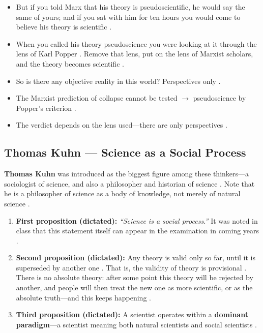 \begin{CriticalPoint}
\begin{itemize}
    \item But if you told Marx that his theory is pseudoscientific, he would say the same of yours; and if you sat with him for ten hours you would come to believe his theory is scientific .
    \item When you called his theory pseudoscience you were looking at it through the lens of Karl Popper . Remove that lens, put on the lens of Marxist scholars, and the theory becomes scientific .
    \item So is there any objective reality in this world? Perspectives only .
\end{itemize}
\end{CriticalPoint}

\begin{QuickRevision}
\begin{itemize}
    \item The Marxist prediction of collapse cannot be tested $\rightarrow$ pseudoscience by Popper's criterion .
    \item The verdict depends on the lens used---there are only perspectives .
\end{itemize}
\end{QuickRevision}

\subsection{Thomas Kuhn --- Science as a Social Process}
\textbf{Thomas Kuhn} was introduced as the biggest figure among these thinkers---a sociologist of science, and also a philosopher and historian of science . Note that he is a philosopher of science as a body of knowledge, not merely of natural science .
\begin{enumerate}
    \item \textbf{First proposition (dictated):} \textit{``Science is a social process.''}  It was noted in class that this statement itself can appear in the examination in coming years .
    \item \textbf{Second proposition (dictated):} Any theory is valid only so far, until it is superseded by another one . That is, the validity of theory is provisional . There is no absolute theory: after some point this theory will be rejected by another, and people will then treat the new one as more scientific, or as the absolute truth---and this keeps happening .
    \item \textbf{Third proposition (dictated):} A scientist operates within a \textbf{dominant paradigm}---a scientist meaning both natural scientists and social scientists .
\end{enumerate}

